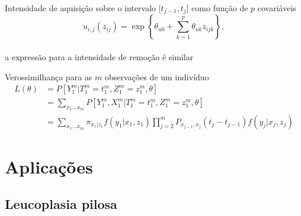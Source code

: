 \documentclass[ignorenonframetext,]{beamer}
\begin{document}
\begin{frame}

\vspace{.15cm}\begin{block}{Intensidade de aquisição sobre o intervalo
              [\(t_{j-1}, t_{j}\)] como função de \(p\) covariáveis}
 \vspace{-.5cm}
 \[u_{i, j}(z_{ij}) =
   \exp\left\{\theta_{u0}+\sum_{k=1}^{p}\theta_{uk}z_{ijk}\right\},\] \\
 \vspace{.15cm}
 \pause a expressão para a intensidade de remoção é similar
\end{block}

\vspace{-.1cm}

\pause

\begin{block}{Verossimilhança para as \(m\) observações de um indivíduo}
 \vspace{-.95cm}
 \pause
 \[\begin{aligned}
   L(\theta) & = P[Y_{1}^{m}|T_{1}^{m} = t_{1}^{m},
                             Z_{1}^{m} = z_{1}^{m}, \theta] \\
             & = \sum_{x_{1} ... x_{m}}
                 P[Y_{1}^{m}, X_{1}^{m}|T_{1}^{m} = t_{1}^{m},
                                        Z_{1}^{m} = z_{1}^{m}, \theta]\\
             & = \sum_{x_{1} ... x_{m}}
                 \pi_{x_{1}|z_{1}} f(y_{1}|x_{1}, z_{1})
                 \prod_{j = 2}^{m}
                  P_{x_{j-1}, x_{j}}(t_{j} - t_{j-1})
                  f(y_{j}|x_{j}, z_{j})
   \end{aligned}\]
 \vspace{-.5cm}
\end{block}

\end{frame}

\section{Aplicações}\label{aplicacoes}

\subsection{Leucoplasia pilosa}\label{leucoplasia-pilosa}
\end{document}
